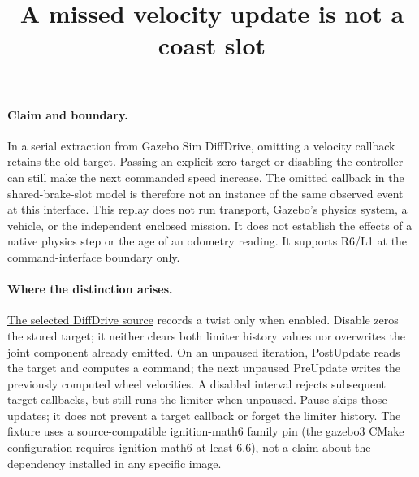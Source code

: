 \documentclass{article}
\title{A missed velocity update is not a coast slot}
\author{}
\date{}
\begin{document}
\maketitle
\paragraph{Claim and boundary.}
In a serial extraction from Gazebo Sim DiffDrive, omitting a velocity
callback retains the old target. Passing an explicit zero target or disabling
the controller can still make the next commanded speed increase. The omitted
callback in the shared-brake-slot model is therefore not an instance of the
same observed event at this interface. This replay does not run transport,
Gazebo's physics system, a vehicle, or the independent enclosed mission. It
does not establish the effects of a native physics step or the age of an
odometry reading. It supports R6/L1 at the command-interface boundary only.

\paragraph{Where the distinction arises.}
\href{https://github.com/gazebosim/gz-sim/blob/9b1151a9c1f5fe6d1af4c6e0d33d1f0992e8a811/src/systems/diff_drive/DiffDrive.cc}{The selected DiffDrive source}
records a twist only when enabled. Disable zeros the stored target; it
neither clears both limiter history values nor overwrites the joint component
already emitted. On an unpaused iteration, PostUpdate reads the target and
computes a command; the next unpaused PreUpdate writes the previously
computed wheel velocities. A disabled interval rejects subsequent target
callbacks, but still runs the limiter when unpaused. Pause skips those
updates; it does not prevent a target callback or forget the limiter history.
The fixture uses a source-compatible ignition-math6 family pin (the
gazebo3 CMake configuration requires ignition-math6 at least 6.6), not a claim
about the dependency installed in any specific image.
\end{document}
